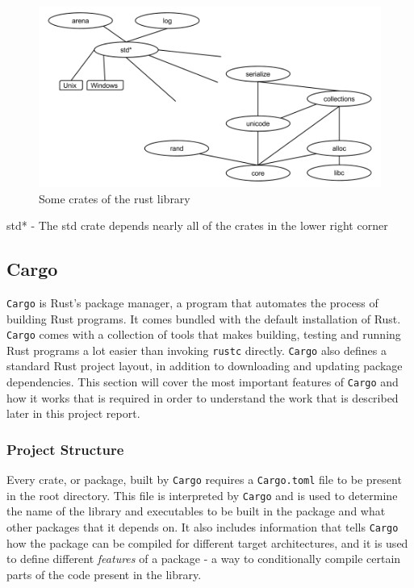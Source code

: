 \begin{figure}[H]
  \begin{center}
    \includegraphics[scale=0.3]{figures/background/rust/rust-lib.png}
  \end{center}
  \caption{Some crates of the rust library}
  \label{fig:rust:librust}
\end{figure}
std* - The std crate depends nearly all of the crates in the lower right corner

\subsection{Cargo}
\label{sec:cargo}

\texttt{Cargo} is Rust's package manager, a program that automates the process of building Rust programs.
It comes bundled with the default installation of Rust.
\texttt{Cargo} comes with a collection of tools that makes building, testing and running Rust programs a lot easier than invoking \texttt{rustc} directly.
\texttt{Cargo} also defines a standard Rust project layout, in addition to downloading and updating package dependencies.
This section will cover the most important features of \texttt{Cargo} and how it works that is required in order to understand the work that is described later in this project report.

\subsubsection{Project Structure}

Every crate, or package, built by \texttt{Cargo} requires a \texttt{Cargo.toml} file to be present in the root directory.
This file is interpreted by \texttt{Cargo} and is used to determine the name of the library and executables to be built in the package and what other packages that it depends on.
It also includes information that tells \texttt{Cargo} how the package can be compiled for different target architectures, and it is used to define different \textit{features} of a package - a way to conditionally compile certain parts of the code present in the library.

